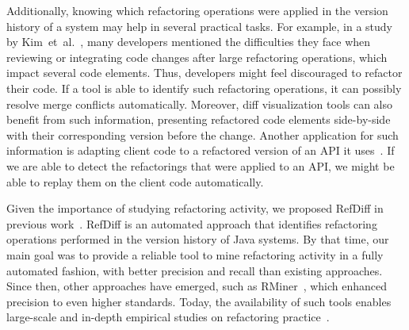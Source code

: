 Additionally, knowing which refactoring operations were applied in the version history of a system may help in several practical tasks.
For example, in a study by Kim~et~al.~\cite{Kim:2012:FSE}, many developers mentioned the difficulties they face when reviewing or integrating code changes after large refactoring operations, which impact several code elements. Thus, developers might feel discouraged to refactor their code. If a tool is able to identify such refactoring operations, it can possibly resolve merge conflicts automatically. 
Moreover, diff visualization tools can also benefit from such information, presenting refactored code elements side-by-side with their corresponding version before the change.
Another application for such information is adapting client code to a refactored version of an API it uses~\cite{henkel2005catchup, Xing:2008:JDevAn}. If we are able to detect the refactorings that were applied to an API, we might be able to replay them on the client code automatically.


Given the importance of studying refactoring activity, we proposed RefDiff in previous work~\cite{msr2017}. RefDiff is an automated approach that identifies refactoring operations performed in the version history of Java systems.
By that time, our main goal was to provide a reliable tool to mine refactoring activity in a fully automated fashion, with better precision and recall than existing approaches. Since then, other approaches have emerged, such as RMiner~\cite{tsantalis2018rminer}, which enhanced precision to even higher standards.
Today, the availability of such tools enables large-scale and in-depth empirical studies on refactoring practice~\cite{fse2016-why-we-refactor, icse2018}.

